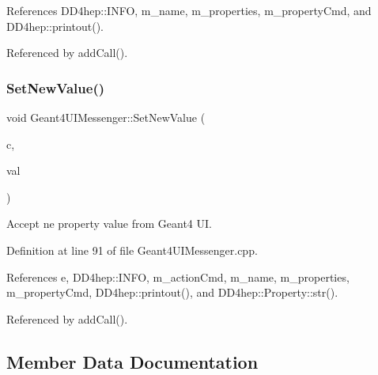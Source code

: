References D\+D4hep\+::\+I\+N\+FO, m\+\_\+name, m\+\_\+properties, m\+\_\+property\+Cmd, and D\+D4hep\+::printout().



Referenced by add\+Call().

\hypertarget{class_d_d4hep_1_1_simulation_1_1_geant4_u_i_messenger_ad8599a95c5a70bc07dbb6c16e81f5894}{}\label{class_d_d4hep_1_1_simulation_1_1_geant4_u_i_messenger_ad8599a95c5a70bc07dbb6c16e81f5894} 
\subsubsection{\texorpdfstring{Set\+New\+Value()}{SetNewValue()}}
{\footnotesize\ttfamily void Geant4\+U\+I\+Messenger\+::\+Set\+New\+Value (\begin{DoxyParamCaption}\item[{G4\+U\+Icommand $\ast$}]{c,  }\item[{G4\+String}]{val }\end{DoxyParamCaption})}



Accept ne property value from Geant4 UI. 



Definition at line 91 of file Geant4\+U\+I\+Messenger.\+cpp.



References e, D\+D4hep\+::\+I\+N\+FO, m\+\_\+action\+Cmd, m\+\_\+name, m\+\_\+properties, m\+\_\+property\+Cmd, D\+D4hep\+::printout(), and D\+D4hep\+::\+Property\+::str().



Referenced by add\+Call().



\subsection{Member Data Documentation}
\hypertarget{class_d_d4hep_1_1_simulation_1_1_geant4_u_i_messenger_afb818b60e55fd0ccd83ec5f7b78eb82c}{}\label{class_d_d4hep_1_1_simulation_1_1_geant4_u_i_messenger_afb818b60e55fd0ccd83ec5f7b78eb82c} 
